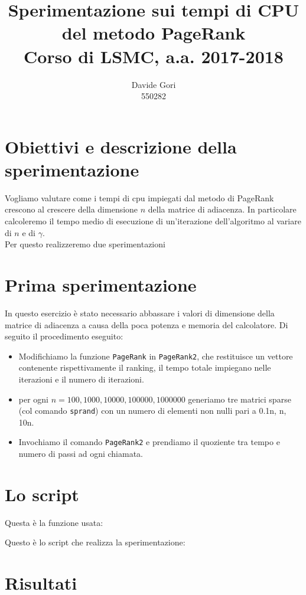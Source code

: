 \documentclass{article}
\title{Sperimentazione sui tempi di CPU del metodo PageRank\\
	Corso di LSMC, a.a. 2017-2018}
\author{Davide Gori\\
	550282}
\begin{document}
	\maketitle
	
	\section{Obiettivi e descrizione della sperimentazione}
	Vogliamo valutare come i tempi di cpu impiegati dal metodo di PageRank crescono al crescere della dimensione $n$ della matrice di adiacenza. In particolare calcoleremo il tempo medio di esecuzione di un'iterazione dell'algoritmo al variare di $n$ e di $\gamma$.\\
	Per questo realizzeremo due sperimentazioni


	\section{Prima sperimentazione}
	In questo esercizio è stato necessario abbassare i valori di dimensione della matrice di adiacenza a causa della poca potenza e memoria del calcolatore. Di seguito il procedimento eseguito:\\
	\begin{itemize}
		\item Modifichiamo la funzione {\tt PageRank} in {\tt PageRank2}, che restituisce un vettore contenente rispettivamente il ranking, il tempo totale impiegano nelle iterazioni e
		il numero di iterazioni.
		\item per ogni $n=100, 1000, 10000, 100000, 1000000$ generiamo tre matrici sparse (col comando {\tt sprand}) con un numero di elementi non nulli pari a 0.1n, n, 10n.
		\item Invochiamo il comando {\tt PageRank2} e prendiamo il quoziente tra tempo e numero di passi ad ogni chiamata.
	\end{itemize}
	
	\section{Lo script}
	Questa è la funzione usata:
	
	
	
	Questo è lo script che realizza la sperimentazione:
	
	
	
	\section{Risultati}
	
\end{document}
